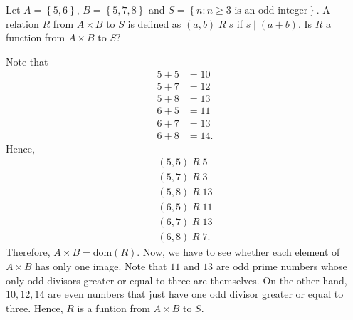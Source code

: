 \documentclass[12pt]{article}
\newenvironment{problem}[2][Problem]{\begin{trivlist} \item[\hskip \labelsep {\bfseries #1}\hskip \labelsep {\bfseries #2.}]}{\end{trivlist}}
\newenvironment{solution}[2][Solution]{\begin{trivlist} \item[\hskip \labelsep {\bfseries #1}\hskip \labelsep {\bfseries #2.}]}{\end{trivlist}}
\begin{document}
 \begin{problem}{8}
   Let $A=\left\{5,6 \right\}$, $B=\left\{ 5,7,8 \right\}$ and $S=\left\{n:n\geq 3 \text{ is an odd integer} \right\}$. A relation $R$ from $A\times B$ to $S$ is defined as $(a,b)\; R\; s$ if $s\mid (a+b)$. Is $R$ a function from $A\times B$ to $S$?
   \begin{solution}{8}
     Note that 
    \begin{align*}
      5+5 &= 10\\
      5+7 &= 12\\
      5+8 &= 13\\
      6+5 &= 11\\
      6+7 &= 13\\
      6+8 &= 14.
    \end{align*}
    Hence,
    \begin{align*}
    (5,5)\; R \;5\\
    (5,7)\; R \;3\\
    (5,8)\; R \;13\\
    (6,5)\; R \;11\\
    (6,7)\; R \;13\\
    (6,8)\; R \;7.
    \end{align*}
    Therefore, $A\times B = \text{dom}(R)$. Now, we have to see whether each element of $A\times B$ has only one image. Note that $11$ and $13$ are odd prime numbers whose only odd divisors greater or equal to three are themselves. On the other hand, $10,12,14$ are even numbers that just have one odd divisor greater or equal to three. Hence, $R$ is a funtion from $A\times B$ to $S$.
   \end{solution} 
    \end{problem}
\end{document}
